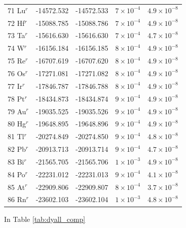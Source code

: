\begin{longtable}{l r r r r}
71 Lu$^{r}$ &   -14572.532        & -14572.533        &   $7\times10^{-4}$      &   $4.9\times10^{-8}$    \\
72 Hf$^{r}$ &   -15088.785        & -15088.786        &   $7\times10^{-4}$      &   $4.9\times10^{-8}$    \\
73 Ta$^{r}$ &   -15616.630        & -15616.630        &   $7\times10^{-4}$      &   $4.7\times10^{-8}$    \\
74 W$^{r}$  &   -16156.184        & -16156.185        &   $8\times10^{-4}$      &   $4.9\times10^{-8}$    \\
75 Re$^{r}$ &   -16707.619        & -16707.620        &   $8\times10^{-4}$      &   $4.9\times10^{-8}$    \\
76 Os$^{r}$ &   -17271.081        & -17271.082        &   $8\times10^{-4}$      &   $4.9\times10^{-8}$    \\
77 Ir$^{r}$ &   -17846.787        & -17846.788        &   $8\times10^{-4}$      &   $4.9\times10^{-8}$    \\
78 Pt$^{r}$ &   -18434.873        & -18434.874        &   $9\times10^{-4}$      &   $4.9\times10^{-8}$    \\
79 Au$^{r}$ &   -19035.525        & -19035.526        &   $9\times10^{-4}$      &   $4.9\times10^{-8}$    \\
80 Hg$^{r}$ &   -19648.895        & -19648.896        &   $9\times10^{-4}$      &   $4.9\times10^{-8}$    \\
81 Tl$^{r}$ &   -20274.849        & -20274.850        &   $9\times10^{-4}$      &   $4.8\times10^{-8}$    \\
82 Pb$^{r}$ &   -20913.713        & -20913.714        &   $9\times10^{-4}$      &   $4.7\times10^{-8}$    \\
83 Bi$^{r}$ &   -21565.705        & -21565.706        &   $1\times10^{-3}$      &   $4.9\times10^{-8}$    \\
84 Po$^{r}$ &   -22231.012        & -22231.013        &   $9\times10^{-4}$      &   $4.1\times10^{-8}$    \\
85 At$^{r}$ &   -22909.806        & -22909.807        &   $8\times10^{-4}$      &   $3.7\times10^{-8}$    \\
86 Rn$^{r}$ &   -23602.103        & -23602.104        &   $1\times10^{-3}$      &   $4.8\times10^{-8}$    \\
\bottomrule  	
\end{longtable}

In Table \ref{tab:dyall_comp}

